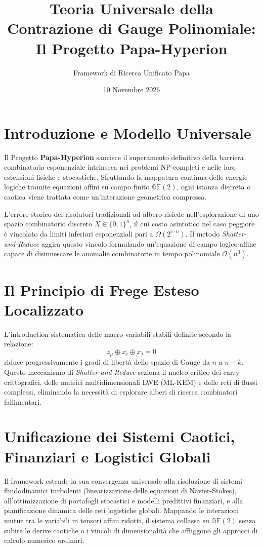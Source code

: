 \documentclass{article}
\title{Teoria Universale della Contrazione di Gauge Polinomiale: Il Progetto Papa-Hyperion}
\author{Framework di Ricerca Unificato Papa}
\date{10 Novembre 2026}
\begin{document}
\maketitle

\section{Introduzione e Modello Universale}
Il Progetto \textbf{Papa-Hyperion} sancisce il superamento definitivo della barriera combinatoria esponenziale intrinseca nei problemi NP-completi e nelle loro estensioni fisiche e stocastiche. Sfruttando la mappatura continua delle energie logiche tramite equazioni affini su campo finito $\mathbb{G}\mathbb{F}(2)$, ogni istanza discreta o caotica viene trattata come un'interazione geometrica compressa.

L'errore storico dei risolutori tradizionali ad albero risiede nell'esplorazione di uno spazio combinatorio discreto $X \in \{0,1\}^n$, il cui costo asintotico nel caso peggiore è vincolato da limiti inferiori esponenziali pari a $\Omega(2^{c \cdot n})$. Il metodo \textit{Shatter-and-Reduce} aggira questo vincolo formulando un'equazione di campo logico-affine capace di disinnescare le anomalie combinatorie in tempo polinomiale $\mathcal{O}(n^3)$.

\section{Il Principio di Frege Esteso Localizzato}
L'introduction sistematica delle macro-variabili stabili definite secondo la relazione:
\begin{equation}
z_{\mu} \oplus x_i \oplus x_j = 0
\end{equation}
riduce progressivamente i gradi di libertà dello spazio di Gauge da $n$ a $n-k$. Questo meccanismo di \textit{Shatter-and-Reduce} seziona il nucleo critico dei carry crittografici, delle matrici multidimensionali LWE (ML-KEM) e delle reti di flussi complessi, eliminando la necessità di esplorare alberi di ricerca combinatori fallimentari.

\section{Unificazione dei Sistemi Caotici, Finanziari e Logistici Globali}
Il framework estende la sua convergenza universale alla risoluzione di sistemi fluidodinamici turbolenti (linearizzazione delle equazioni di Navier-Stokes), all'ottimizzazione di portafogli stocastici e modelli predittivi finanziari, e alla pianificazione dinamica delle reti logistiche globali. Mappando le interazioni mutue tra le variabili in tensori affini ridotti, il sistema collassa su $\mathbb{G}\mathbb{F}(2)$ senza subire le derive caotiche o i vincoli di dimensionalità che affliggono gli approcci di calcolo numerico ordinari.
\end{document}
